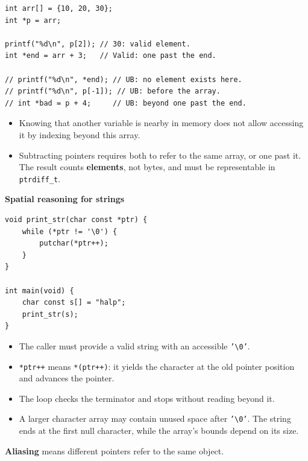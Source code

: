 \documentclass[11pt,a4paper]{article}
\begin{document}
\begin{lstlisting}[style=cscode]
int arr[] = {10, 20, 30};
int *p = arr;

printf("%d\n", p[2]); // 30: valid element.
int *end = arr + 3;   // Valid: one past the end.

// printf("%d\n", *end); // UB: no element exists here.
// printf("%d\n", p[-1]); // UB: before the array.
// int *bad = p + 4;     // UB: beyond one past the end.
\end{lstlisting}

\begin{itemize}
    \item Knowing that another variable is nearby in memory does
          not allow accessing it by indexing beyond this array.
    \item Subtracting pointers requires both to refer to the same
          array, or one past it. The result counts
          \textbf{elements}, not bytes, and must be representable
          in \texttt{ptrdiff\_t}.
\end{itemize}

\textbf{Spatial reasoning for strings}

\begin{lstlisting}[style=cscode]
void print_str(char const *ptr) {
    while (*ptr != '\0') {
        putchar(*ptr++);
    }
}

int main(void) {
    char const s[] = "halp";
    print_str(s);
}
\end{lstlisting}

\begin{itemize}
    \item The caller must provide a valid string with an
          accessible \texttt{'\textbackslash0'}.
    \item \texttt{*ptr++} means \texttt{*(ptr++)}: it yields the
          character at the old pointer position and advances
          the pointer.
    \item The loop checks the terminator and stops without
          reading beyond it.
    \item A larger character array may contain unused space
          after \texttt{'\textbackslash0'}. The string ends at
          the first null character, while the array's bounds
          depend on its size.
\end{itemize}


\textbf{Aliasing} means different pointers refer to the same object.
\end{document}
